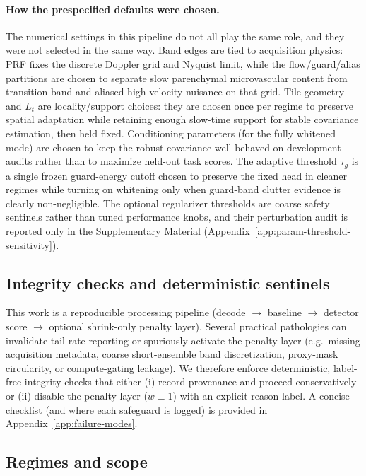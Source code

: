 \documentclass[11pt]{article}
\newif\ifSTAPPAPERONLY
\newcommand{\SuppOrApp}[1]{\ifSTAPPAPERONLY Supplementary Material\else Appendix~\ref{#1}\fi}
\begin{document}
\paragraph{How the prespecified defaults were chosen.}
The numerical settings in this pipeline do not all play the same role, and they were not selected in the same way. Band edges are tied to acquisition physics: PRF fixes the discrete Doppler grid and Nyquist limit, while the flow/guard/alias partitions are chosen to separate slow parenchymal microvascular content from transition-band and aliased high-velocity nuisance on that grid. Tile geometry and $L_t$ are locality/support choices: they are chosen once per regime to preserve spatial adaptation while retaining enough slow-time support for stable covariance estimation, then held fixed. Conditioning parameters (for the fully whitened mode) are chosen to keep the robust covariance well behaved on development audits rather than to maximize held-out task scores. The adaptive threshold $\tau_g$ is a single frozen guard-energy cutoff chosen to preserve the fixed head in cleaner regimes while turning on whitening only when guard-band clutter evidence is clearly non-negligible. The optional regularizer thresholds are coarse safety sentinels rather than tuned performance knobs, and their perturbation audit is reported only in the Supplementary Material (\SuppOrApp{app:param-threshold-sensitivity}).

\subsection{Integrity checks and deterministic sentinels}

This work is a reproducible processing pipeline (decode $\rightarrow$ baseline $\rightarrow$ detector score $\rightarrow$ optional shrink-only penalty layer). Several practical pathologies can invalidate tail-rate reporting or spuriously activate the penalty layer (e.g.\ missing acquisition metadata, coarse short-ensemble band discretization, proxy-mask circularity, or compute-gating leakage). We therefore enforce deterministic, label-free integrity checks that either (i) record provenance and proceed conservatively or (ii) disable the penalty layer ($w\equiv 1$) with an explicit reason label. A concise checklist (and where each safeguard is logged) is provided in \SuppOrApp{app:failure-modes}.

\subsection{Regimes and scope}
\label{sec:results-overview}
\end{document}
